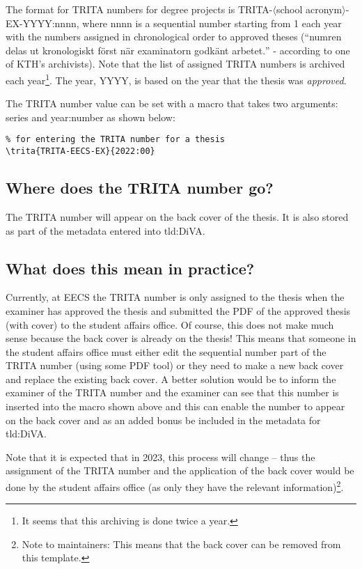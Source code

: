 The format for TRITA numbers for degree projects is TRITA-$\langle$school acronym$\rangle$-EX-YYYY:nnnn, where nnnn is a sequential number starting from 1 each year with the numbers assigned in chronological order to approved theses (``\foreignlanguage{swedish}{numren delas ut kronologiskt först när examinatorn godkänt arbetet.}'' - according to one of KTH's archivists). Note that the list of assigned TRITA numbers is archived each year\footnote{It seems that this archiving is done twice a year.}. The year, YYYY, is based on the year that the thesis was \emph{approved}.

The TRITA number value can be set with a macro that takes two arguments: series and year:number as shown below:
\begin{lstlisting}
% for entering the TRITA number for a thesis
\trita{TRITA-EECS-EX}{2022:00}  
\end{lstlisting}

\subsection{Where does the TRITA number go?}
The TRITA number will appear on the back cover of the thesis. It is also stored as part of the metadata entered into \gls{tld:DiVA}.

\subsection{What does this mean in practice?}
Currently, at EECS the TRITA number is only assigned to the thesis when the examiner has approved the thesis and submitted the PDF of the approved thesis (with cover) to the student affairs office. Of course, this does not make much sense because the back cover is already on the thesis! This means that someone in the student affairs office must either \first edit the sequential number part of the TRITA number (using some PDF tool) or \Second they need to make a new back cover and replace the existing back cover. A better solution would be to inform the examiner of the TRITA number and the examiner can see that this number is inserted into the macro shown above and this can enable the number to appear on the back cover and as an added bonus be included in the metadata for \gls{tld:DiVA}.

Note that it is expected that in 2023, this process will change -- thus the assignment of the TRITA number and the application of the back cover would be done by the student affairs office (as only they have the relevant information)\footnote{Note to maintainers: This means that the back cover can be removed from this template.}.


